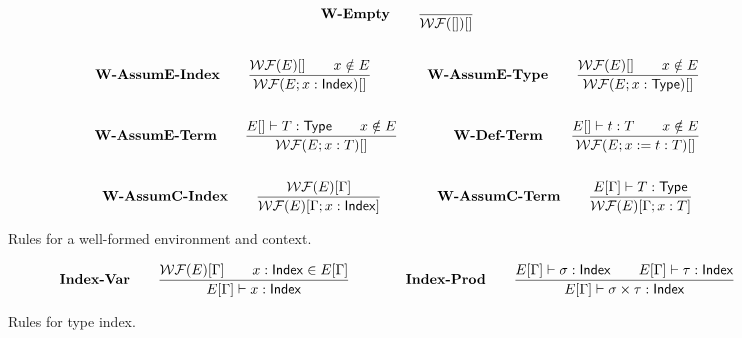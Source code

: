 \documentclass{article}
\begin{document}
\begin{figure}[h]
    \begin{gather*}
        \textbf{W-Empty} \qquad
        \frac{}{\mathcal{WF}([])[]} \\
        \\
        \textbf{W-AssumE-Index} \qquad
        \frac{\mathcal{WF}(E)[] \qquad x \notin E}{\mathcal{WF}(E; x : \mathsf{Index})[]}\qquad \qquad
        \textbf{W-AssumE-Type} \qquad
        \frac{\mathcal{WF}(E)[] \qquad x \notin E}{\mathcal{WF}(E; x : \mathsf{Type})[]} \\
        \\
        \textbf{W-AssumE-Term} \qquad
        \frac{E[] \vdash T : \mathsf{Type} \qquad x \notin E}{\mathcal{WF}(E; x:T)[]}
        \qquad \qquad
        \textbf{W-Def-Term} \qquad
        \frac{E[]\vdash t:T \qquad x \notin E}{\mathcal{WF}(E; x:=t:T)[]} \\
        \\
        \textbf{W-AssumC-Index} \qquad
        \frac{\mathcal{WF}(E)[\Gamma]}{\mathcal{WF}(E)[\Gamma; x : \mathsf{Index}]}
        \qquad \qquad
        \textbf{W-AssumC-Term} \qquad
        \frac{E[\Gamma] \vdash T : \mathsf{Type}}{\mathcal{WF}(E)[\Gamma; x : T]}
    \end{gather*}
    \caption{Rules for a well-formed environment and context.}
\end{figure}

\begin{figure}
    \begin{gather*}
        \textbf{Index-Var} \qquad
        \frac{\mathcal{WF}(E)[\Gamma] \qquad x : \mathsf{Index} \in E[\Gamma]}{E[\Gamma] \vdash x : \mathsf{Index}}
        \qquad \qquad
        \textbf{Index-Prod} \qquad
        \frac{E[\Gamma] \vdash \sigma : \mathsf{Index} \qquad E[\Gamma] \vdash \tau : \mathsf{Index}}{E[\Gamma] \vdash \sigma \times \tau : \mathsf{Index}}
    \end{gather*}
    \caption{Rules for type index.}
\end{figure}
\end{document}
